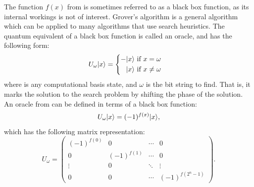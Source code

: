 The function $f(x)$ from  is sometimes referred to as a black box function, as its internal workings is not of interest.
Grover's algorithm is a general algorithm which can be applied to many algorithms that use search heuristics.
The quantum equivalent of a black box function is called an oracle, and has the following form:
\begin{equation} \label{eqn:oracle}
U_\omega\vert{x}\rangle = 
\begin{cases}
\begin{aligned}
-\vert{x}\rangle & \text{ if } x = \omega \\
\phantom{-}\vert{x}\rangle & \text{ if } x \neq \omega
\end{aligned}
\end{cases}
\end{equation}
where  is any computational basis state, and $\omega$ is the bit string to find.
That is, it marks the solution to the search problem by shifting the phase of the solution.
An oracle from  can be defined in terms of a black box function:
\begin{equation}
U_\omega\vert{x}\rangle = (-1)^{f(x)}\vert{x}\rangle,
\end{equation}
which has the following matrix representation:
\begin{equation}
U_\omega =
\begin{pmatrix}
(-1)^{f(0)} & 0 & \cdots & 0 \\
0 & (-1)^{f(1)} & \cdots & 0 \\
\vdots & 0 & \ddots & \vdots \\
0 & 0 & \cdots & (-1)^{f(2^n-1)}
\end{pmatrix}.
\end{equation}

